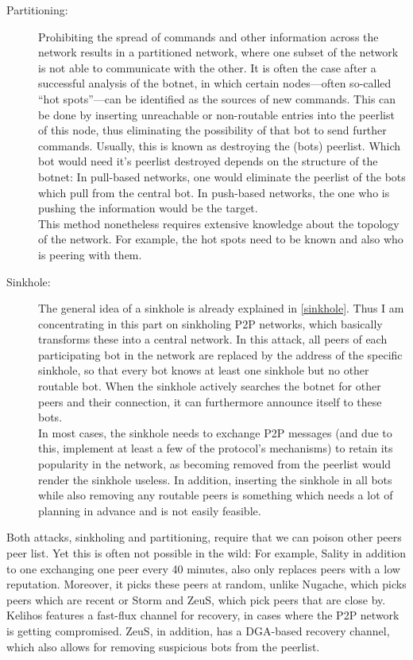 \documentclass[10pt, a4paper, twocolumn]{article} %
\begin{document}
\begin{description}
\item[Partitioning:] Prohibiting the spread of commands and other information across the network results in a partitioned network, where one subset of the network is not able to communicate with the other. It is often the case after a successful analysis of the botnet, in which certain nodes---often so-called ``hot spots''---can be identified as the sources of new commands. This can be done by inserting unreachable or non-routable entries into the peerlist of this node, thus eliminating the possibility of that bot to send further commands. Usually, this is known as destroying the (bots) peerlist. Which bot would need it's peerlist destroyed depends on the structure of the botnet: In pull-based networks, one would eliminate the peerlist of the bots which pull from the central bot. In push-based networks, the one who is pushing the information would be the target. \\
This method nonetheless requires extensive knowledge about the topology of the network. For example, the hot spots need to be known and also who is peering with them.

\item[Sinkhole:] The general idea of a sinkhole is already explained in \autoref{sinkhole}. Thus I am concentrating in this part on sinkholing P2P networks, which basically transforms these into a central network. In this attack, all peers of each participating bot in the network are replaced by the address of the specific sinkhole, so that every bot knows at least one sinkhole but no other routable bot. When the sinkhole actively searches the botnet for other peers and their connection, it can furthermore announce itself to these bots. \\
In most cases, the sinkhole needs to exchange P2P messages (and due to this, implement at least a few of the protocol's mechanisms) to retain its popularity in the network, as becoming removed from the peerlist would render the sinkhole useless. 
In addition, inserting the sinkhole in all bots while also removing any routable peers is something which needs a lot of planning in advance and is not easily feasible.
\end{description}

Both attacks, sinkholing and partitioning, require that we can poison other peers peer list. Yet this is often not possible in the wild: For example, Sality in addition to one exchanging one peer every 40 minutes, also only replaces peers with a low reputation. Moreover, it picks these peers at random, unlike Nugache, which picks peers which are recent or Storm and ZeuS, which pick peers that are close by. Kelihos features a fast-flux channel for recovery, in cases where the P2P network is getting compromised. ZeuS, in addition, has a DGA-based recovery channel, which also allows for removing suspicious bots from the peerlist. 
\end{document}
